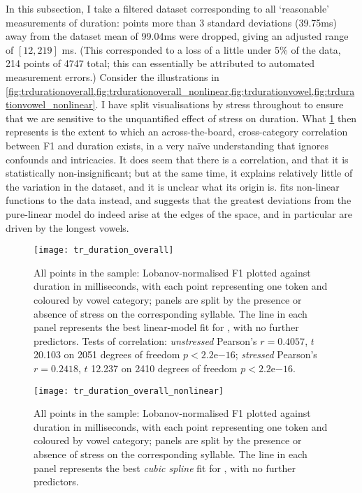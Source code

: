 In this subsection, I take a filtered dataset corresponding to all `reasonable' measurements of duration: points more than 3 standard deviations (39.75ms) away from the dataset mean of 99.04ms were dropped, giving an adjusted range of $[12,219]$ ms. (This corresponded to a loss of a little under 5\% of the data, 214 points of 4747 total; this can essentially be attributed to automated measurement errors.) Consider the illustrations in \cref{fig:trdurationoverall,fig:trdurationoverall_nonlinear,fig:trdurationvowel,fig:trdurationvowel_nonlinear}. I have split visualisations by stress throughout to ensure that we are sensitive to the unquantified effect of stress on duration. What \cref{fig:trdurationoverall} then represents is the extent to which an across-the-board, cross-category correlation between F1 and duration exists, in a very naïve understanding that ignores confounds and intricacies. It does seem that there is a correlation, and that it is statistically non-insignificant; but at the same time, it explains relatively little of the variation in the dataset, and it is unclear what its origin is.  fits non-linear functions to the data instead, and suggests that the greatest deviations from the pure-linear model do indeed arise at the edges of the space, and in particular are driven by the longest vowels.

\begin{figure}[H]
  \centering
  \texttt{[image: tr\_duration\_overall]}
  \caption[Duration plotted against F1 for all points in the sample.]{All points in the sample: Lobanov-normalised F1 plotted against duration in milliseconds, with each point representing one token and coloured by vowel category; panels are split by the presence or absence of stress on the corresponding syllable. The line in each panel represents the best linear-model fit for , with no further predictors. Tests of correlation: \emph{unstressed} Pearson's $r = 0.4057$, $t$ 20.103 on 2051 degrees of freedom $p < 2.2$e$-16$; \emph{stressed} Pearson's $r = 0.2418$, $t$ 12.237 on 2410 degrees of freedom $p < 2.2$e$-16$.}
  \label{fig:trdurationoverall}
\end{figure}


\begin{figure}[H]
  \centering
  \texttt{[image: tr\_duration\_overall\_nonlinear]}
  \caption[Duration plotted against F1 for all points in the sample, with cubic spline fit.]{All points in the sample: Lobanov-normalised F1 plotted against duration in milliseconds, with each point representing one token and coloured by vowel category; panels are split by the presence or absence of stress on the corresponding syllable. The line in each panel represents the best \emph{cubic spline} fit for , with no further predictors.}
  \label{fig:trdurationoverall_nonlinear}
\end{figure}

